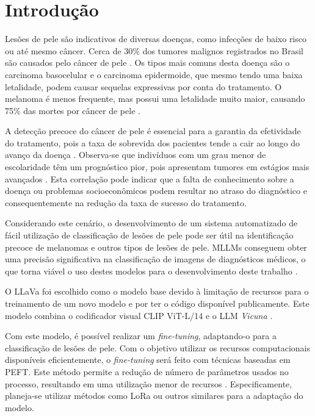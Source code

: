 \chapter{Introdução}

Lesões de pele são indicativos de diversas doenças, como infecções de baixo risco ou até mesmo câncer. Cerca de 30\% dos tumores malignos registrados no Brasil são
causados pelo câncer de pele \cite{skin_cancer_in_brazil}. Os tipos mais comuns desta doença são o carcinoma basocelular e o carcinoma epidermoide, que mesmo tendo uma
baixa letalidade, podem causar sequelas expressivas por conta do tratamento. O melanoma é menos frequente, mas possui uma letalidade muito maior, causando 75\% das mortes
por câncer de pele \cite{skin_cancer_screening}.

A detecção precoce do câncer de pele é essencial para a garantia da efetividade do tratamento, pois a taxa de sobrevida dos pacientes tende a cair ao longo do avanço
da doença \cite{skin_cancer_survival}. Observa-se que indivíduos com um grau menor de escolaridade têm um prognóstico pior, pois apresentam tumores em estágios mais
avançados \cite{skin_cancer_socioeconomic}. Esta correlação pode indicar que a falta de conhecimento sobre a doença ou problemas socioeconômicos podem resultar no atraso
do diagnóstico e consequentemente na redução da taxa de sucesso do tratamento.

Considerando este cenário, o desenvolvimento de um sistema automatizado de fácil utilização de classificação de lesões de pele pode ser útil na identificação precoce de
melanomas e outros tipos de lesões de pele. \ac{MLLMs} conseguem obter uma precisão significativa na classificação de imagens de diagnósticos médicos, o que torna viável
o uso destes modelos para o desenvolvimento deste trabalho \cite{mllm_success_rate}.

O \ac{LLaVa} foi escolhido como o modelo base devido à limitação de recursos para o treinamento de um novo modelo e por ter o código disponível publicamente. Este
modelo combina o codificador visual \ac{CLIP ViT-L/14} e o \ac{LLM} \textit{Vicuna} \cite{llava}.

Com este modelo, é possível realizar um \textit{fine-tuning}, adaptando-o para a classificação de lesões de pele. Com o objetivo utilizar os recursos computacionais
disponíveis eficientemente, o \textit{fine-tuning} será feito com técnicas baseadas em \ac{PEFT}. Este método permite a redução de número de parâmetros usados no processo,
resultando em uma utilização menor de recursos \cite{peft}. Especificamente, planeja-se utilizar métodos como \ac{LoRa} ou outros similares para a adaptação do modelo.

